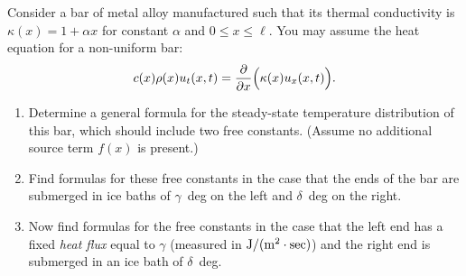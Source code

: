 Consider a bar of metal alloy manufactured such that its thermal conductivity
is $\kappa(x) = 1+\alpha x$ for constant $\alpha$ and $0\le x\le \ell$.
You may assume the heat equation for a non-uniform bar:
\[ c(x) \rho(x) u_t(x,t) = {\partial \over \partial x} \Big(\kappa(x) u_x(x,t)\Big).\]
\begin{enumerate}
\item Determine a general formula for the steady-state temperature distribution 
      of this bar, which should include two free constants.  
      (Assume no additional source term $f(x)$ is present.) 
\item Find formulas for these free constants in the case that the ends of the bar are
      submerged in ice baths of $\gamma$~deg on the left and $\delta$~deg on the right.
\item Now find formulas for the free constants in the case that the left end has a fixed 
      \emph{heat flux} equal to $\gamma$ (measured in ${\rm J}/({\rm m}^2\cdot {\rm sec})$)
      and the right end is submerged in an ice bath of $\delta$~deg.
\end{enumerate}



